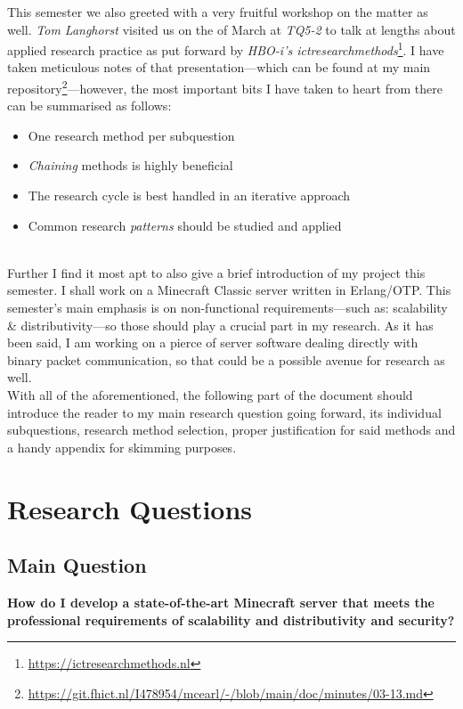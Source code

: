 \documentclass{article}
\begin{document}
    This semester we also greeted with a very fruitful workshop on the matter as well. \textit{Tom Langhorst} visited us on the  of March at \textit{TQ5-2} to talk at lengths about applied research practice as put forward by \textit{HBO-i's ictresearchmethods}\footnote{\url{https://ictresearchmethods.nl}}. I have taken meticulous notes of that presentation---which can be found at my main repository\footnote{\url{https://git.fhict.nl/I478954/mcearl/-/blob/main/doc/minutes/03-13.md}}---however, the most important bits I have taken to heart from there can be summarised as follows:
    \begin{itemize}
        \item One research method per subquestion
        \item \textit{Chaining} methods is highly beneficial
        \item The research cycle is best handled in an iterative approach
        \item Common research \textit{patterns} should be studied and applied
    \end{itemize} \\

    Further I find it most apt to also give a brief introduction of my project this semester. I shall work on a Minecraft Classic server written in Erlang/OTP. This semester's main emphasis is on non-functional requirements---such as: scalability \& distributivity---so those should play a crucial part in my research. As it has been said, I am working on a pierce of server software dealing directly with binary packet communication, so that could be a possible avenue for research as well. \\

    With all of the aforementioned, the following part of the document should introduce the reader to my main research question going forward, its individual subquestions, research method selection, proper justification for said methods and a handy appendix for skimming purposes.

\newpage
\section{Research Questions}
\label{section:research-questions}
    \subsection{Main Question}
    \label{section:main-question}
    \textbf{How do I develop a state-of-the-art Minecraft server that meets the professional requirements of scalability and distributivity and security?}
\end{document}
